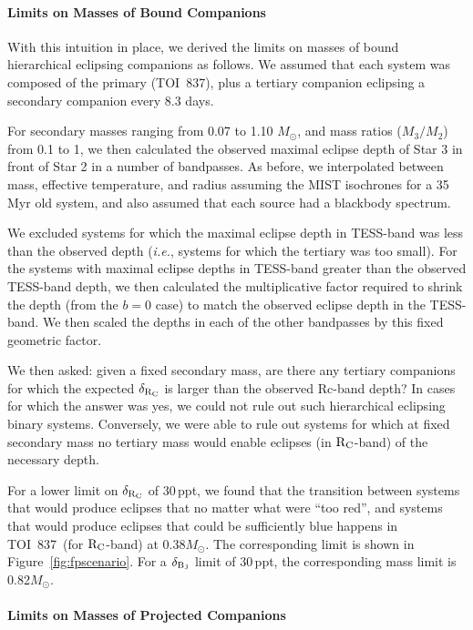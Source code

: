 \documentclass[12pt,twocolumn,tighten]{aastex63}
\newcommand{\tn}{TOI~837} %
\begin{document}
\paragraph{Limits on Masses of Bound Companions}

With this intuition in place, we derived the limits on masses of bound
hierarchical eclipsing companions as follows.  We assumed that each
system was composed of the primary (\tn), plus a tertiary companion
eclipsing a secondary companion every 8.3 days.

For secondary masses ranging from 0.07 to 1.10 $M_\odot$, and
mass ratios ($M_3/M_2$) from 0.1 to 1, we then 
calculated the observed maximal eclipse depth of Star 3 in front of
Star 2 in a number of bandpasses.
As before, we interpolated between mass, effective temperature, and radius
assuming the MIST isochrones for a 35$\,$Myr old system,
and also assumed that each source had a blackbody spectrum.

We excluded systems for which the maximal eclipse depth in TESS-band
was less than the observed depth ({\it i.e.}, systems for which the tertiary
was too small).
For the systems with maximal eclipse depths in TESS-band greater than
the observed TESS-band depth, we then calculated the multiplicative
factor required to shrink the depth (from the $b=0$ case) to match the
observed eclipse depth in the TESS-band.
We then scaled the depths in each of the other bandpasses by this
fixed geometric factor.

We then asked: given a fixed secondary mass, are there any tertiary
companions for which the expected $\delta_{\rm R_C}$ is larger than
the observed Rc-band depth?
In cases for which the answer was yes, we could not rule out such
hierarchical eclipsing binary systems.
Conversely, we were able to rule out systems
for which at fixed secondary mass no tertiary mass would
enable eclipses (in ${\rm R_C}$-band) of the necessary depth.

For a lower limit on $\delta_{\rm R_C}$ of 30$\,$ppt,
we found that the transition between systems that would produce
eclipses that no matter what were ``too red'', and systems that would
produce eclipses that could be sufficiently blue happens in \tn\ (for
${\rm R_C}$-band) at 0.38$M_\odot$.
The corresponding limit is shown in Figure~\ref{fig:fpscenario}.
For a $\delta_{\rm B_J}$ limit of 30$\,$ppt, the corresponding mass
limit is 0.82$M_\odot$.

\paragraph{Limits on Masses of Projected Companions}
\end{document}
